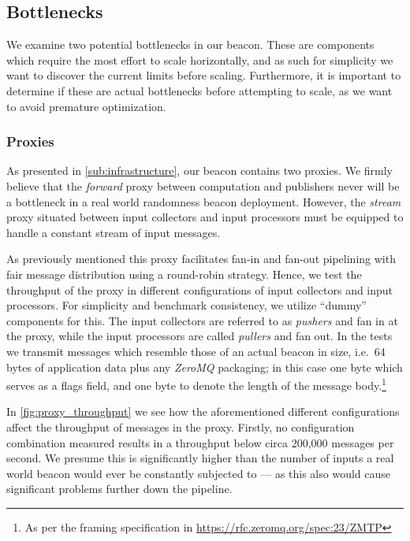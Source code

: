 \subsection{Bottlenecks}%
\label{sub:bottlenecks}
We examine two potential bottlenecks in our beacon.
These are components which require the most effort to scale horizontally, and as such for simplicity we want to discover the current limits before scaling.
Furthermore, it is important to determine if these are actual bottlenecks before attempting to scale, as we want to avoid premature optimization.

\subsubsection{Proxies}%
\label{ssub:proxies}
As presented in \vref{sub:infrastructure}, our beacon contains two proxies.
We firmly believe that the \textit{forward} proxy between computation and publishers never will be a bottleneck in a real world randomness beacon deployment.
However, the \textit{stream} proxy situated between input collectors and input processors must be equipped to handle a constant stream of input messages.

As previously mentioned this proxy facilitates fan-in and fan-out pipelining with fair message distribution using a round-robin strategy.
Hence, we test the throughput of the proxy in different configurations of input collectors and input processors.
For simplicity and benchmark consistency, we utilize \enquote{dummy} components for this.
The input collectors are referred to as \textit{pushers} and fan in at the proxy, while the input processors are called \textit{pullers} and fan out.
In the tests we transmit messages which resemble those of an actual beacon in size, i.e.\ 64 bytes of application data plus any \textit{ZeroMQ} packaging; in this case one byte which serves as a flags field, and one byte to denote the length of the message body.\footnote{As per the framing specification in \url{https://rfc.zeromq.org/spec:23/ZMTP}}

In \vref{fig:proxy_throughput} we see how the aforementioned different configurations affect the throughput of messages in the proxy.
Firstly, no configuration combination measured results in a throughput below circa 200,000 messages per second.
We presume this is significantly higher than the number of inputs a real world beacon would ever be constantly subjected to --- as this also would cause significant problems further down the pipeline.


